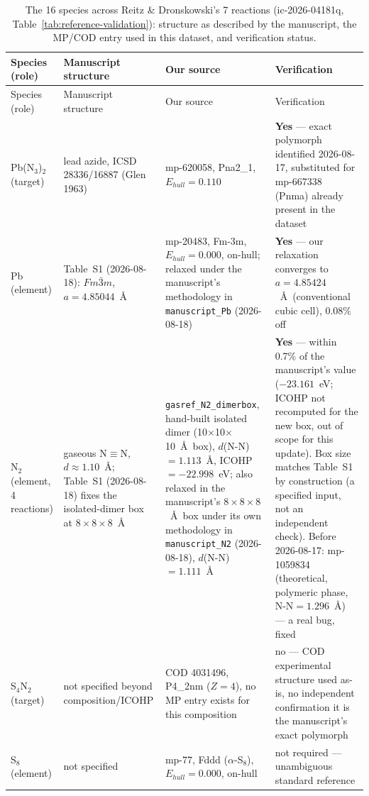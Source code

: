 \begin{longtable}{@{}p{2.6cm} p{3.0cm} p{3.6cm} p{5.2cm}@{}}
\caption{The 16 species across Reitz \& Dronskowski's 7 reactions (ic-2026-04181q, Table~\ref{tab:reference-validation}): structure as described by the manuscript, the MP/COD entry used in this dataset, and verification status.}\label{tab:reitz-dronskowski-structures}\\
\toprule
Species (role) & Manuscript structure & Our source & Verification \\
\midrule
\endfirsthead
\toprule
Species (role) & Manuscript structure & Our source & Verification \\
\midrule
\endhead
\bottomrule
\endfoot
Pb(N$_3$)$_2$ (target) & lead azide, ICSD 28336/16887 (Glen 1963) & mp-620058, Pna2\_1, $E_{hull}=0.110$ & \textbf{Yes} --- exact polymorph identified 2026-08-17, substituted for mp-667338 (Pnma) already present in the dataset \\
\midrule
Pb (element) & Table~S1 (2026-08-18): $Fm\bar{3}m$, $a=4.85044$~\AA & mp-20483, Fm-3m, $E_{hull}=0.000$, on-hull; relaxed under the manuscript's methodology in \texttt{manuscript\_Pb} (2026-08-18) & \textbf{Yes} --- our relaxation converges to $a=4.85424$~\AA\ (conventional cubic cell), $0.08\%$ off \\
\midrule
N$_2$ (element, 4 reactions) & gaseous N$\equiv$N, $d\approx1.10$~\AA; Table~S1 (2026-08-18) fixes the isolated-dimer box at $8\times8\times8$~\AA & \texttt{gasref\_N2\_dimerbox}, hand-built isolated dimer (10$\times$10$\times$10~\AA\ box), $d$(N-N)$=1.113$~\AA, ICOHP$=-22.998$~eV; also relaxed in the manuscript's $8\times8\times8$~\AA\ box under its own methodology in \texttt{manuscript\_N2} (2026-08-18), $d$(N-N)$=1.111$~\AA & \textbf{Yes} --- within 0.7\% of the manuscript's value ($-23.161$~eV; ICOHP not recomputed for the new box, out of scope for this update). Box size matches Table~S1 by construction (a specified input, not an independent check). Before 2026-08-17: mp-1059834 (theoretical, polymeric phase, N-N$=1.296$~\AA) --- a real bug, fixed \\
\midrule
S$_4$N$_2$ (target) & not specified beyond composition/ICOHP & COD 4031496, P4\_2nm ($Z=4$), no MP entry exists for this composition & no --- COD experimental structure used as-is, no independent confirmation it is the manuscript's exact polymorph \\
\midrule
S$_8$ (element) & not specified & mp-77, Fddd ($\alpha$-S$_8$), $E_{hull}=0.000$, on-hull & not required --- unambiguous standard reference \\

\end{longtable}
